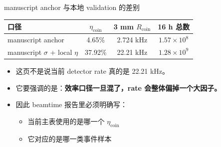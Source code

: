 \documentclass[aspectratio=169]{ctexbeamer}
\begin{document}
\begin{frame}{manuscript anchor 与本地 validation 的差别}
\small
\centering
\begin{tabular}{>{\raggedright\arraybackslash}p{3.0cm}ccc}
\toprule
口径 & $\eta_{\mathrm{coin}}$ & 3 mm $R_{\mathrm{coin}}$ & 16 h 总数 \\
\midrule
manuscript anchor & 4.65\% & 2.724 kHz & $1.57\times 10^8$ \\
manuscript $\sigma$ + local $\eta$ & 37.92\% & 22.21 kHz & $1.28\times 10^9$ \\
\bottomrule
\end{tabular}

\vspace{0.35cm}
\begin{itemize}
  \item 这页不是说当前 detector rate 真的是 22.21 kHz。
  \item 它要强调的是：\textbf{效率口径一旦混了，rate 会整体偏掉一个大因子。}
  \item 因此 beamtime 报告里必须明确写：
  \begin{itemize}
    \item 当前主表使用的是哪一个 $\eta_{\mathrm{coin}}$
    \item 它对应的是哪一类事件样本
  \end{itemize}
\end{itemize}
\end{frame}
\end{document}
